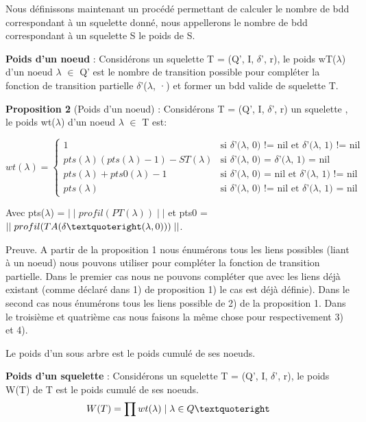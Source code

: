 \documentclass[french]{article}
\begin{document}
Nous définissons maintenant un procédé permettant de calculer le nombre de bdd correspondant à un squelette donné, nous appellerons le nombre de bdd correspondant à un squelette S le poids de S.

\textbf{Poids d'un noeud} : Considérons un squelette T = (Q’, I, \(\delta\)’, r), le poids wT(\(\lambda\)) d'un noeud \(\lambda\) \(\in\) Q’ est le nombre de transition possible pour compléter la fonction de transition partielle \(\delta\)’(\(\lambda\), ·) et former un bdd valide de squelette T.

\textbf{Proposition 2} (Poids d'un noeud) : Considérons T = (Q’, I, \(\delta\)’, r) un squelette , le poids wt(\(\lambda\)) d'un noeud \(\lambda\) \(\in\) T est:

\begin{equation}
    wt(\lambda) =
    \begin{cases}
        1 & \text{si \(\delta\)’(\(\lambda\), 0) != nil et \(\delta\)’(\(\lambda\), 1) != nil}\\
        pts(\lambda) (pts(\lambda) - 1) - ST(\lambda) & \text{si \(\delta\)’(\(\lambda\), 0) = \(\delta\)’(\(\lambda\), 1) = nil}\\
        pts(\lambda) + pts0(\lambda) - 1  & \text{si \(\delta\)’(\(\lambda\), 0) = nil et \(\delta\)’(\(\lambda\), 1) != nil}\\
        pts(\lambda)   & \text{si \(\delta\)’(\(\lambda\), 0) != nil et \(\delta\)’(\(\lambda\), 1) = nil}
    \end{cases}       
\end{equation}

Avec pts(\(\lambda\)) = \(\mid\mid profil(PT(\lambda)) \mid\mid\) et pts0 = \(\mid\mid profil(TA(\delta \textquoteright(\lambda,0))) \mid\mid\).

Preuve. A partir de la proposition 1 nous énumérons tous les liens possibles (liant à un noeud) nous pouvons utiliser pour compléter la fonction de transition partielle. Dans le premier cas nous ne pouvons compléter que avec les liens déjà existant (comme déclaré dans 1) de proposition 1) le cas est déjà définie). Dans le second cas nous énumérons tous les liens possible de 2) de la proposition 1. Dans le troisième et quatrième cas nous faisons la même chose pour respectivement  3) et 4).
\vspace{5mm} 

Le poids d'un sous arbre est le poids cumulé de ses noeuds.

\textbf{Poids d'un squelette} : Considérons un squelette T = (Q’, I, \(\delta\)’, r), le poids W(T) de T est le poids cumulé de ses noeuds.
\[W(T) = \prod wt(\lambda) \mid \lambda \in Q\textquoteright\]
\end{document}
